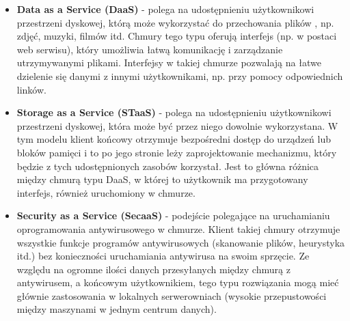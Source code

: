 \documentclass[10pt,a4paper,titlepage,twoside]{report}
\begin{document}
\begin{itemize}
	\item \textbf{Data as a Service (DaaS)} - polega na udostępnieniu użytkownikowi przestrzeni dyskowej, którą może wykorzystać do przechowania plików \cite{ad10}, np. zdjęć, muzyki, filmów itd. Chmury tego typu oferują interfejs (np. w postaci web serwisu), który umożliwia łatwą komunikację i zarządzanie utrzymywanymi plikami. Interfejsy w takiej chmurze pozwalają na łatwe dzielenie się danymi z innymi użytkownikami, np. przy pomocy odpowiednich linków.
	\item \textbf{Storage as a Service (STaaS)} - polega na udostępnieniu użytkownikowi przestrzeni dyskowej, która może być przez niego dowolnie wykorzystana. W tym modelu klient końcowy otrzymuje bezpośredni dostęp do urządzeń lub bloków pamięci i to po jego stronie leży zaprojektowanie mechanizmu, który będzie z tych udostępnionych zasobów korzystał\cite{ad10}. Jest to główna różnica między chmurą typu DaaS, w której to użytkownik ma przygotowany interfejs, również uruchomiony w chmurze.
	\item \textbf{Security as a Service (SecaaS)} - podejście polegające na uruchamianiu oprogramowania antywirusowego w chmurze. Klient takiej chmury otrzymuje wszystkie funkcje programów antywirusowych (skanowanie plików, heurystyka itd.) bez konieczności uruchamiania antywirusa na swoim sprzęcie. Ze względu na ogromne ilości danych przesyłanych między chmurą z antywirusem, a końcowym użytkownikiem, tego typu rozwiązania mogą mieć głównie zastosowania w lokalnych serwerowniach (wysokie przepustowości między maszynami w jednym centrum danych).
\end{itemize}
\end{document}
